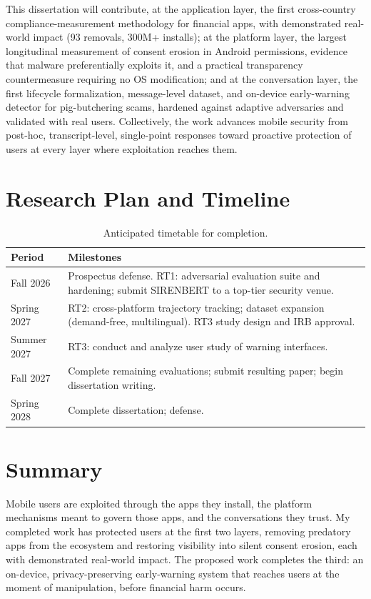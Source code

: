 \documentclass[letterpaper,11pt]{article}
\begin{document}
This dissertation will contribute, at the application layer, the first
cross-country compliance-measurement methodology for financial apps,
with demonstrated real-world impact (93 removals, 300M+ installs); at
the platform layer, the largest longitudinal measurement of consent
erosion in Android permissions, evidence that malware preferentially
exploits it, and a practical transparency countermeasure requiring no
OS modification; and at the conversation layer, the first lifecycle
formalization, message-level dataset, and on-device early-warning
detector for pig-butchering scams, hardened against adaptive
adversaries and validated with real users. Collectively, the work
advances mobile security from post-hoc, transcript-level, single-point
responses toward proactive protection of users at every layer where
exploitation reaches them.

\section{Research Plan and Timeline}
\label{sec:timeline}

\begin{table}[h]
\centering
\small
\begin{tabular}{p{1.4in}p{4.6in}}
\toprule
\textbf{Period} & \textbf{Milestones} \\
\midrule
Fall 2026 & Prospectus defense. RT1: adversarial evaluation suite and
hardening; submit SIRENBERT to a top-tier security venue. \\
Spring 2027 & RT2: cross-platform trajectory tracking; dataset
expansion (demand-free, multilingual). RT3 study design and IRB
approval. \\
Summer 2027 & RT3: conduct and analyze user study of warning
interfaces. \\
Fall 2027 & Complete remaining evaluations; submit resulting paper;
begin dissertation writing. \\
Spring 2028 & Complete dissertation; defense. \\
\bottomrule
\end{tabular}
\caption{Anticipated timetable for completion.}
\end{table}

\section{Summary}

Mobile users are exploited through the apps they install, the platform
mechanisms meant to govern those apps, and the conversations they
trust. My completed work has protected users at the first two layers,
removing predatory apps from the ecosystem and restoring visibility
into silent consent erosion, each with demonstrated real-world impact.
The proposed work completes the third: an on-device, privacy-preserving
early-warning system that reaches users at the moment of manipulation,
before financial harm occurs.




\end{document}
